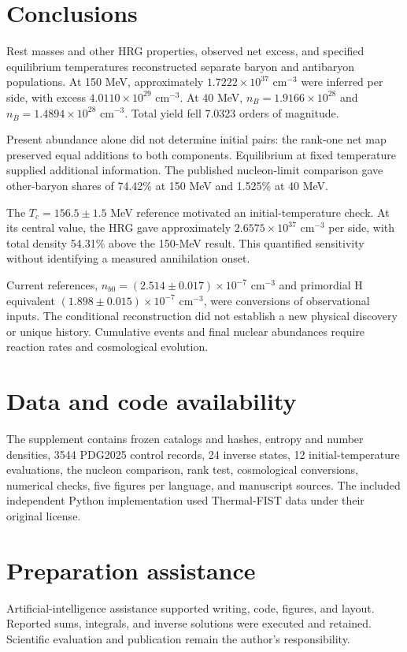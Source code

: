 \section{Conclusions}
Rest masses and other HRG properties, observed net excess, and specified equilibrium temperatures reconstructed separate baryon and antibaryon populations. At 150 MeV, approximately $1.7222\times10^{37}$ cm$^{-3}$ were inferred per side, with excess $4.0110\times10^{29}$ cm$^{-3}$. At 40 MeV, $n_B=1.9166\times10^{28}$ and $n_{\bar B}=1.4894\times10^{28}$ cm$^{-3}$. Total yield fell 7.0323 orders of magnitude.

Present abundance alone did not determine initial pairs: the rank-one net map preserved equal additions to both components. Equilibrium at fixed temperature supplied additional information. The published nucleon-limit comparison gave other-baryon shares of 74.42\% at 150 MeV and 1.525\% at 40 MeV.

The $T_c=156.5\pm1.5$ MeV reference motivated an initial-temperature check. At its central value, the HRG gave approximately $2.6575\times10^{37}$ cm$^{-3}$ per side, with total density 54.31\% above the 150-MeV result. This quantified sensitivity without identifying a measured annihilation onset.

Current references, $n_{b0}=(2.514\pm0.017)\times10^{-7}$ cm$^{-3}$ and primordial H equivalent $(1.898\pm0.015)\times10^{-7}$ cm$^{-3}$, were conversions of observational inputs. The conditional reconstruction did not establish a new physical discovery or unique history. Cumulative events and final nuclear abundances require reaction rates and cosmological evolution.

\section*{Data and code availability}
The supplement contains frozen catalogs and hashes, entropy and number densities, 3544 PDG2025 control records, 24 inverse states, 12 initial-temperature evaluations, the nucleon comparison, rank test, cosmological conversions, numerical checks, five figures per language, and manuscript sources. The included independent Python implementation used Thermal-FIST data under their original license.

\section*{Preparation assistance}
Artificial-intelligence assistance supported writing, code, figures, and layout. Reported sums, integrals, and inverse solutions were executed and retained. Scientific evaluation and publication remain the author's responsibility.
